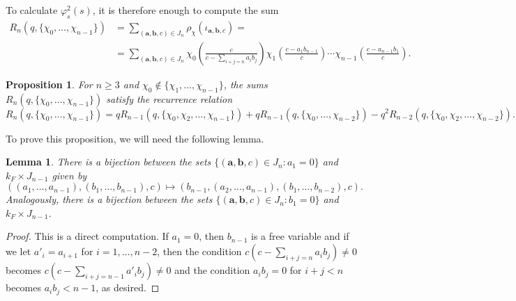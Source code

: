 \documentclass{article}
\theoremstyle{plain}
\newtheorem{proposition}[theorem]{Proposition}
\newtheorem{lemma}[theorem]{Lemma}
\theoremstyle{definition}
\begin{document}
    To calculate $\varphi_s^2(s)$, it is therefore enough to compute the sum
    \begin{align*}
        R_n(q,\{\chi_0,\ldots,\chi_{n-1}\})&=\sum_{(\mathbf{a},\mathbf{b},c)\in J_n}\rho_\chi(\iota_{\mathbf{a},\mathbf{b},c})=\\
        &=\sum_{(\mathbf{a},\mathbf{b},c)\in J_n}\chi_0\left(\frac{c}{c-\sum_{i+j=n}a_ib_j}\right)\chi_1\left(\frac{c-a_1b_{n-1}}{c}\right)%
        \cdots\chi_{n-1}\left(\frac{c-a_{n-1}b_1}{c}\right).
    \end{align*}

    \begin{proposition}\label{prop_Rvalues}
        For $n\geq 3$ and $\chi_0\not\in\{\chi_1,\ldots,\chi_{n-1}\}$, the sums $R_n(q,\{\chi_0,\ldots,\chi_{n-1}\})$ satisfy the recurrence relation
        \begin{equation*}%
            R_n(q,\{\chi_0,\ldots,\chi_{n-1}\})=qR_{n-1}(q,\{\chi_0,\chi_2,\ldots,\chi_{n-1}\})+qR_{n-1}(q,\{\chi_0,\ldots,\chi_{n-2}\})-q^2R_{n-2}(q,\{\chi_0,\chi_2,\ldots,\chi_{n-2}\}).
        \end{equation*}
    \end{proposition}

    To prove this proposition, we will need the following lemma.

    \begin{lemma}\label{lem_Jsets}
        There is a bijection between the sets $\{(\mathbf{a},\mathbf{b},c)\in J_n:a_1=0\}$ and $k_F\times J_{n-1}$ given by
        $$((a_1,\ldots,a_{n-1}),(b_1,\ldots,b_{n-1}),c)\longmapsto (b_{n-1},(a_2,\ldots,a_{n-1}),(b_1,\ldots,b_{n-2}),c).$$
        Analogously, there is a bijection between the sets $\{(\mathbf{a},\mathbf{b},c)\in J_n:b_1=0\}$ and $k_F\times J_{n-1}$.
    \end{lemma}
    \begin{proof}
        This is a direct computation. If $a_1=0$, then $b_{n-1}$ is a free variable and if we let $a'_i=a_{i+1}$ for $i=1,\ldots,n-2$, then the condition $c(c-\sum_{i+j=n}a_ib_j)\neq0$ becomes $c(c-\sum_{i+j=n-1}a'_ib_j)\neq0$ and the condition $a_ib_j=0$ for $i+j<n$ becomes $a_ib_j<n-1$, as desired.
    \end{proof}
\end{document}
